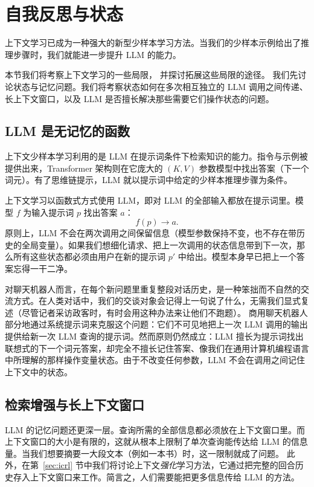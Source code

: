 \section{自我反思与状态}\label{sec:state}
上下文学习已成为一种强大的新型少样本学习方法。当我们的少样本示例给出了推理步骤时，我们就能进一步提升 LLM 的能力。

本节我们将考察上下文学习的一些局限，
并探讨拓展这些局限的途径。
%
我们先讨论状态与记忆问题。我们将考察状态如何在多次相互独立的 LLM 调用之间传递、长上下文窗口，以及 LLM 是否擅长解决那些需要它们操作状态的问题。%




\subsection{LLM 是无记忆的函数}
上下文少样本学习利用的是 LLM 在提示词条件下检索知识的能力。指令与示例被提供出来，Transformer 架构则在它庞大的 $(K,V)$ 参数模型中找出答案（下一个词元）。有了思维链提示，LLM 就以提示词中给定的少样本推理步骤为条件。%

上下文学习以函数式方式使用 LLM，即对 LLM 的全部输入都放在提示词里。模型 $f$ 为输入提示词 $p$ 找出答案 $a$：$$f(p)\rightarrow a.$$
原则上，LLM 不会在两次调用之间保留信息（模型参数保持不变，也不存在带历史的全局变量）。如果我们想细化请求、把上一次调用的状态信息带到下一次，那么所有这些状态都必须由用户在新的提示词 $p'$ 中给出。模型本身早已把上一个答案忘得一干二净。

对聊天机器人而言，在每个新问题里重复整段对话历史，是一种笨拙而不自然的交流方式。在人类对话中，我们的交谈对象会记得上一句说了什么，无需我们显式复述（尽管记者采访政客时，有时会用这种办法来让他们不跑题）。
商用聊天机器人部分地通过系统提示词来克服这个问题：它们不可见地把上一次 LLM 调用的输出提供给新一次 LLM 查询的提示词。然而原则仍然成立：LLM 擅长为提示词找出联想式的下一个词元答案，却完全不擅长记住答案、像我们在通用计算机编程语言中所理解的那样操作变量状态。由于不改变任何参数，LLM 不会在调用之间记住上下文中的状态。

\subsection{检索增强与长上下文窗口}
LLM 的记忆问题还更深一层。查询所需的全部信息都必须放在上下文窗口里。而上下文窗口的大小是有限的，这就从根本上限制了单次查询能传达给 LLM 的信息量。当我们想要摘要一大段文本（例如一本书）时，这一限制就成了问题。%
此外，在第~\ref{sec:icrl} 节中我们将讨论上下文{\em 强化}学习方法，它通过把完整的回合历史存入上下文窗口来工作。简言之，人们需要能把更多信息传给 LLM 的方法。

